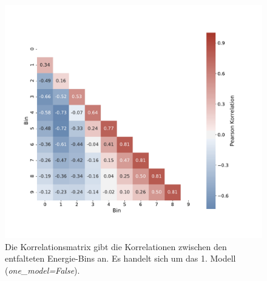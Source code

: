 \begin{figure}
    \centering
    \includegraphics[width=1\textwidth]{Plots/DSEA/False/correlation_matrix.pdf}
    \caption[Korrelationsmatrix des 1. Modells in DSEA]{Die Korrelationsmatrix gibt die Korrelationen zwischen den entfalteten Energie-Bins an.
    Es handelt sich um das 1. Modell (\textit{one\_model=False}).
    }
    \label{fig:dsea_correlation_false}
\end{figure}